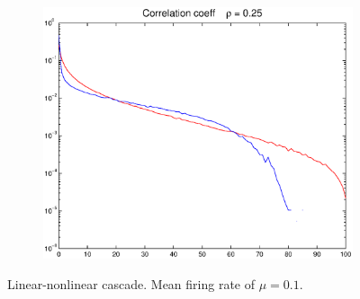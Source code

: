 \documentclass[11pt]{article}
\begin{document}
\begin{figure}[H]
	\begin{subfigure}[h]{0.66\textwidth}
	\centering
	\includegraphics[width=\textwidth]{../Figures/Lin_Filter/Filt_DG_indiv_mu_01_rho_25}
	\label{fig12}
	\end{subfigure}
	\caption{\footnotesize Linear-nonlinear cascade. Mean firing rate of $\mu = 0.1$.}
\end{figure}
\end{document}
